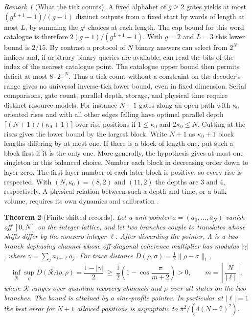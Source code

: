 \documentclass[11pt,reqno]{amsart}
\newtheorem{theorem}{Theorem}[section]
\theoremstyle{definition}
\theoremstyle{remark}
\newtheorem{remark}[theorem]{Remark}
\numberwithin{equation}{section}
\begin{document}
\begin{remark}[What the tick counts]\label{d4:resources}
A fixed alphabet of \(g\ge2\) gates yields at most
\((g^{L+1}-1)/(g-1)\) distinct outputs from a fixed start by words of
length at most \(L\), by summing the \(g^j\) choices at each length.
The cap bound for this word catalogue is therefore
\(2(g-1)/(g^{L+1}-1)\). With \(g=2\) and \(L=3\) this lower bound is
\(2/15\). By contrast a protocol of \(N\) binary answers can select
from \(2^N\) indices and, if arbitrary binary queries are available,
can read the bits of the index of the nearest catalogue point. The
catalogue upper bound then permits deficit at most \(8\cdot2^{-N}\).
Thus a tick count without a constraint on the decoder's range gives no
universal inverse-tick lower bound, even in fixed dimension. Serial
comparisons, gate count, parallel depth, storage, and physical time
require distinct resource models. For instance \(N+1\) gates along
an open path with \(\kappa_0\) oriented rises and with all other
edges falling have optimal parallel depth
\(\lceil(N+1)/(\kappa_0+1)\rceil\) over rise positions if
\(1\le\kappa_0\) and \(2\kappa_0\le N\).
Cutting at the rises gives the lower bound by the largest block.
Write \(N+1\) as \(\kappa_0+1\) block lengths differing by at most one.
If there is a block of length one, put such a block first if it is the
only one. More generally, the hypothesis gives at most one singleton
in this balanced choice. Number each block in decreasing order down
to layer zero. The first layer number of each later block is positive,
so every rise is respected. With \((N,\kappa_0)=(8,2)\) and \((11,2)\)
the depths are \(3\) and \(4\), respectively. A physical relation
between such a depth and time, or a bulk volume, requires its own
dynamics and calibration \cite{d4-nielsen,d4-brown}.
\end{remark}


\begin{theorem}[Finite shifted records]\label{d4:record}
Let a unit pointer \(a=(a_0,\ldots,a_N)\) vanish off \([0,N]\) on the
integer lattice, and let two branches couple to translates whose shifts
differ by the nonzero integer \(\ell\). After discarding the pointer,
\(\Lambda\) is a two-branch dephasing channel whose off-diagonal
coherence multiplier has modulus \(|\gamma|\), where
\(\gamma=\sum_j a_{j+\ell}\overline a_j\). For trace distance
\(D(\rho,\sigma)=\frac12\|\rho-\sigma\|_1\),
\begin{equation}\label{d4:record-bound}
 \inf_{\mathcal R}\sup_\rho D(\mathcal R\Lambda\rho,\rho)
   =\frac{1-|\gamma|}{2}
   \ \ge\ \frac12\left(1-\cos\frac{\pi}{m+2}\right)>0,
 \qquad m=\left\lfloor\frac{N}{|\ell|}\right\rfloor ,
\end{equation}
where \(\mathcal R\) ranges over quantum recovery channels and
\(\rho\) over all states on the two branches. The bound is attained by
a sine-profile pointer. In particular at \(|\ell|=1\) the best error
for \(N+1\) allowed positions is asymptotic to \(\pi^2/(4(N+2)^2)\).
\end{theorem}
\end{document}
